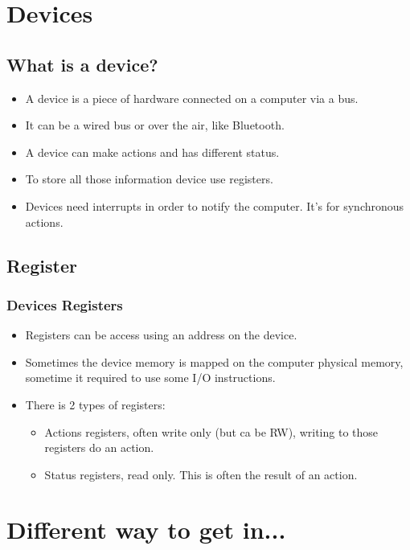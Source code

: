 \section{Devices}

\subsection{What is a device?}
\begin{frame}
\begin{itemize}
  \item A device is a piece of hardware connected on a computer via a
        bus.
  \item It can be a wired bus or over the air, like Bluetooth.
  \item A device can make actions and has different status.
  \item To store all those information device use registers.
  \item Devices need interrupts in order to notify the computer. It's
  for synchronous actions.
\end{itemize}
\end{frame}
\subsection{Register}
\begin{frame}
\frametitle{Devices Registers}
\begin{itemize}
        \item Registers can be access using an address on the device.
        \item Sometimes the device memory is mapped on the computer physical memory, sometime it required to use some I/O instructions.
        \item There is 2 types of registers:
        \begin{itemize}
          \item Actions registers, often write only (but ca be RW), writing to those registers do an action.
          \item Status registers, read only. This is often the result of an action.
        \end{itemize}
\end{itemize}
\end{frame}


\section{Different way to get in...}
